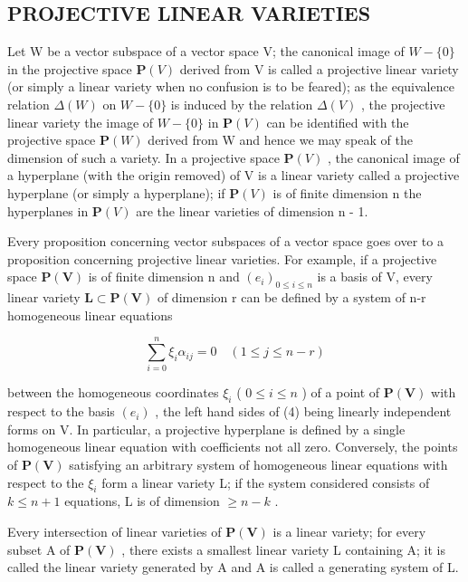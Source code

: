 \subsection{PROJECTIVE LINEAR VARIETIES}

Let W be a vector subspace of a vector space V; the canonical image of \(W - \{0\}\) in the projective space \(\mathbf{P}(V)\) derived from V is called a projective linear variety (or simply a linear variety when no confusion is to be feared); as the equivalence relation \(\Delta(W)\) on \(W - \{0\}\) is induced by the relation \(\Delta(V)\) , the projective linear variety the image of \(W - \{0\}\) in \(\mathbf{P}(V)\) can be identified with the projective space \(\mathbf{P}(W)\) derived from W and hence we may speak of the dimension of such a variety. In a projective space \(\mathbf{P}(V)\) , the canonical image of a hyperplane (with the origin removed) of V is a linear variety called a projective hyperplane (or simply a hyperplane); if \(\mathbf{P}(V)\) is of finite dimension n the hyperplanes in \(\mathbf{P}(V)\) are the linear varieties of dimension n - 1.

Every proposition concerning vector subspaces of a vector space goes over to a proposition concerning projective linear varieties. For example, if a projective space \(\mathbf{P}(\mathbf{V})\) is of finite dimension n and \((e_{i})_{0\leqslant i\leqslant n}\) is a basis of V, every linear variety \(\mathbf{L}\subset\mathbf{P}(\mathbf{V})\) of dimension r can be defined by a system of n-r homogeneous linear equations

\[
\sum_ {i = 0} ^ {n} \xi_ {i} \alpha_ {i j} = 0 \quad (1 \leqslant j \leqslant n - r)\tag{4}
\]

between the homogeneous coordinates \(\xi_{i}\) ( \(0 \leqslant i \leqslant n\) ) of a point of \(\mathbf{P}(\mathbf{V})\) with respect to the basis \((e_{i})\) , the left hand sides of (4) being linearly independent forms on V. In particular, a projective hyperplane is defined by a single homogeneous linear equation with coefficients not all zero. Conversely, the points of \(\mathbf{P}(\mathbf{V})\) satisfying an arbitrary system of homogeneous linear equations with respect to the \(\xi_{i}\) form a linear variety L; if the system considered consists of \(k \leqslant n + 1\) equations, L is of dimension \(\geqslant n - k\) .

Every intersection of linear varieties of \(\mathbf{P}(\mathbf{V})\) is a linear variety; for every subset A of \(\mathbf{P}(\mathbf{V})\) , there exists a smallest linear variety L containing A; it is called the linear variety generated by A and A is called a generating system of L.

